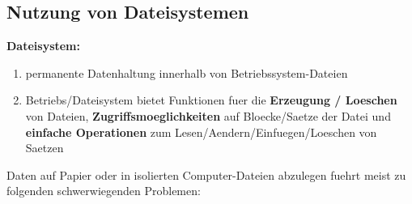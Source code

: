 \documentclass[a4paper,10pt]{article}
\begin{document}
\subsection{Nutzung von Dateisystemen}
\textbf{Dateisystem:}
\begin{enumerate}
\item permanente Datenhaltung innerhalb von Betriebssystem-Dateien
\item Betriebs/Dateisystem bietet Funktionen fuer die \textbf{Erzeugung / Loeschen} von Dateien, \textbf{Zugriffsmoeglichkeiten} auf Bloecke/Saetze der Datei und \textbf{einfache Operationen} zum Lesen/Aendern/Einfuegen/Loeschen von Saetzen
\end{enumerate}

Daten auf Papier oder in isolierten Computer-Dateien abzulegen fuehrt meist zu folgenden schwerwiegenden Problemen:
\end{document}
